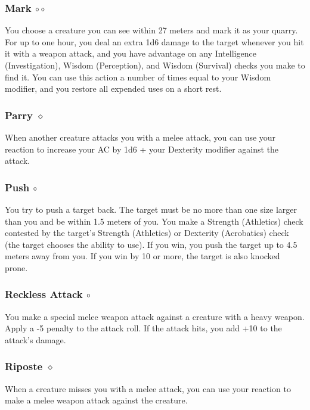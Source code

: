 \subsubsection{Mark $\circ\circ$} \label{act::mark}
    You choose a creature you can see within 27 meters and mark it as your quarry.
    For up to one hour, you deal an extra 1d6 damage to the target whenever you hit it with a weapon attack, and you have advantage on any Intelligence (Investigation), Wisdom (Perception), and Wisdom (Survival) checks you make to find it.
    You can use this action a number of times equal to your Wisdom modifier, and you restore all expended uses on a short rest.

\subsubsection{Parry $\diamond$} \label{act::parry}
    When another creature attacks you with a melee attack, you can use your reaction to increase your AC by 1d6 + your Dexterity modifier against the attack.

\subsubsection{Push $\circ$} \label{act::push}
    You try to push a target back.
    The target must be no more than one size larger than you and be within 1.5 meters of you.
    You make a Strength (Athletics) check contested by the target's Strength (Athletics) or Dexterity (Acrobatics) check (the target chooses the ability to use).
    If you win, you push the target up to 4.5 meters away from you.
    If you win by 10 or more, the target is also knocked prone.

\subsubsection{Reckless Attack $\circ$} \label{act::recklessattack}
    You make a special melee weapon attack against a creature with a heavy weapon.
    Apply a -5 penalty to the attack roll.
    If the attack hits, you add +10 to the attack's damage.

\subsubsection{Riposte $\diamond$} \label{act::riposte}
    When a creature misses you with a melee attack, you can use your reaction to make a melee weapon attack against the creature.

